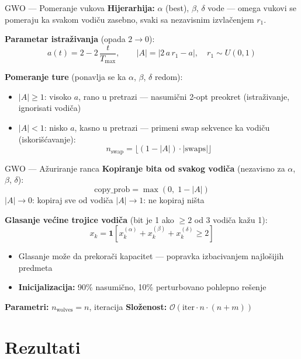 \documentclass[aspectratio=169]{beamer}
\begin{document}
\begin{frame}{GWO --- Pomeranje vukova}
  \textbf{Hijerarhija:} $\alpha$ (best), $\beta$, $\delta$ vode --- omega vukovi se pomeraju ka svakom vodiču zasebno, svaki sa nezavisnim izvlačenjem $r_1$.

  \medskip
  \textbf{Parametar istraživanja} (opada $2 \to 0$):
  \[
    a(t) = 2 - 2\,\frac{t}{T_{\max}}, \qquad
    |A| = |2\,a\,r_1 - a|, \quad r_1 \sim U(0,1)
  \]

  \textbf{Pomeranje ture} (ponavlja se ka $\alpha$, $\beta$, $\delta$ redom):
  \begin{itemize}
    \item $|A| \geq 1$: visoko $a$, rano u pretrazi --- nasumični 2-opt preokret (istraživanje, ignorisati vodiča)
    \item $|A| < 1$: nisko $a$, kasno u pretrazi --- primeni swap sekvence ka vodiču (iskorišćavanje):
      \[
        n_{\text{swap}} = \lfloor (1 - |A|) \cdot |\text{swaps}| \rfloor
      \]
  \end{itemize}
\end{frame}

\begin{frame}{GWO --- Ažuriranje ranca}
  \textbf{Kopiranje bita od svakog vodiča} (nezavisno za $\alpha$, $\beta$, $\delta$):
  \[
    \text{copy\_prob} = \max(0,\; 1 - |A|)
  \]
  {\small $|A| \to 0$: kopiraj sve od vodiča \quad $|A| \to 1$: ne kopiraj ništa}

  \bigskip
  \textbf{Glasanje većine trojice vodiča} (bit je 1 ako $\geq 2$ od 3 vodiča kažu 1):
  \[
    x_k = \mathbf{1}\!\left[x_k^{(\alpha)} + x_k^{(\beta)} + x_k^{(\delta)} \geq 2\right]
  \]

  \begin{itemize}
    \item Glasanje može da prekorači kapacitet --- popravka izbacivanjem najlošijih predmeta
    \item \textbf{Inicijalizacija:} 90\% nasumično, 10\% perturbovano pohlepno rešenje
  \end{itemize}

  \medskip
  \textbf{Parametri:} $n_{\text{wolves}} = n$, iteracija \quad
  \textbf{Složenost:} $\mathcal{O}(\text{iter} \cdot n \cdot (n + m))$
\end{frame}

\section{Rezultati}
\end{document}
